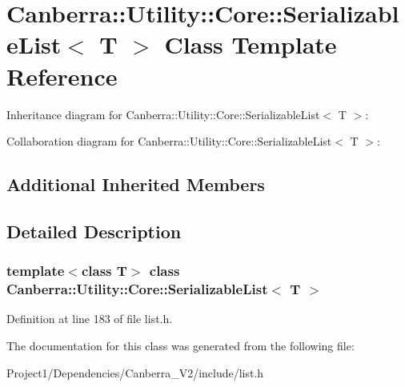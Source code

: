 \hypertarget{class_canberra_1_1_utility_1_1_core_1_1_serializable_list}{}\section{Canberra\+:\+:Utility\+:\+:Core\+:\+:Serializable\+List$<$ T $>$ Class Template Reference}
\label{class_canberra_1_1_utility_1_1_core_1_1_serializable_list}


Inheritance diagram for Canberra\+:\+:Utility\+:\+:Core\+:\+:Serializable\+List$<$ T $>$\+:


Collaboration diagram for Canberra\+:\+:Utility\+:\+:Core\+:\+:Serializable\+List$<$ T $>$\+:
\subsection*{Additional Inherited Members}


\subsection{Detailed Description}
\subsubsection*{template$<$class T$>$\newline
class Canberra\+::\+Utility\+::\+Core\+::\+Serializable\+List$<$ T $>$}



Definition at line 183 of file list.\+h.



The documentation for this class was generated from the following file\+:\begin{DoxyCompactItemize}
\item 
Project1/\+Dependencies/\+Canberra\+\_\+\+V2/include/list.\+h\end{DoxyCompactItemize}
